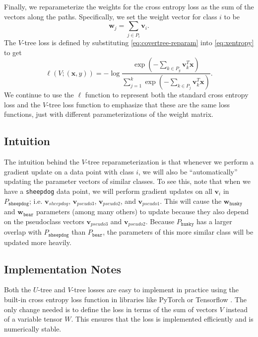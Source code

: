 \documentclass[twoside]{article}
\newcommand{\trans}[1]{{#1}^{T}}
\newcommand{\vv}{\mathbf v}
\newcommand{\w}{\mathbf w}
\newcommand{\x}{\mathbf x}
\begin{document}
Finally, we reparameterize the weights for the cross entropy loss as the sum of the vectors along the paths.
Specifically, we set the weight vector for class $i$ to be 
\begin{equation}
    \label{eq:covertree-reparam}
    \w_j = \sum_{j\in P_i} \vv_i
    .
\end{equation}
The $V$-tree loss is defined by substituting \eqref{eq:covertree-reparam} into \eqref{eq:xentropy} to get
\begin{equation}
    \ell(V;(\x,y)) = - \log \frac {\exp(-\sum_{k\in P_y}\trans\vv_k \x)}{\sum_{j=1}^k \exp(- \sum_{k\in P_j}\trans\vv_k \x)}
    .
\end{equation}
We continue to use the $\ell$ function to represent both the standard cross entropy loss and the $V$-tree loss function to emphasize that these are the same loss functions,
just with different parameterizations of the weight matrix.

\subsection{Intuition}

The intuition behind the $V$-tree reparameterization is that whenever we perform a gradient update on a data point with class $i$,
we will also be ``automatically'' updating the parameter vectors of similar classes.
To see this, note that when we have a \texttt{sheepdog} data point,
we will perform gradient updates on all $\vv_i$ in $P_\texttt{sheepdog}$; i.e. $\vv_{sheepdog}$, $\vv_{\textit{pseudo3}}$, $\vv_{\textit{pseudo2}}$, and $\vv_{\textit{pseudo1}}$.
This will cause the $\w_{\texttt{husky}}$ and $\w_{\texttt{bear}}$ parameters (among many others) to update because they also depend on the pseudoclass vectors $\vv_{\textit{pseudo3}}$ and $\vv{_\textit{pseudo2}}$.
Because $P_\texttt{husky}$ has a larger overlap with $P_\texttt{sheepdog}$ than $P_\texttt{bear}$,
the parameters of this more similar class will be updated more heavily.

\subsection{Implementation Notes}

Both the $U$-tree and $V$-tree losses are easy to implement in practice using the built-in cross entropy loss function in libraries like PyTorch \citep{NEURIPS2019_9015} or Tensorflow \citep{tensorflow2015-whitepaper}.
The only change needed is to define the loss in terms of the sum of vectors $V$ instead of a variable tensor $W$.
This ensures that the loss is implemented efficiently and is numerically stable.
\end{document}
